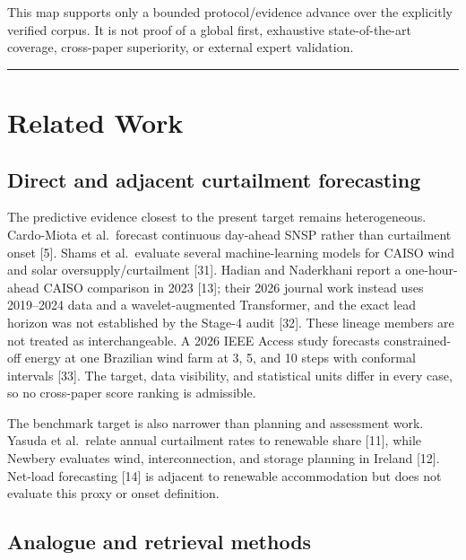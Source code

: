 \documentclass{ieeeaccess}
\begin{document}
This map supports only a bounded protocol/evidence advance over the explicitly verified corpus. It is not proof of a global first, exhaustive state-of-the-art coverage, cross-paper superiority, or external expert validation.

\begin{center}\rule{0.5\linewidth}{0.5pt}\end{center}

\section{Related Work}\label{related-work}

\subsection{Direct and adjacent curtailment forecasting}\label{direct-and-adjacent-curtailment-forecasting}

The predictive evidence closest to the present target remains heterogeneous. Cardo-Miota et al.~forecast continuous day-ahead SNSP rather than curtailment onset {[}5{]}. Shams et al.~evaluate several machine-learning models for CAISO wind and solar oversupply/curtailment {[}31{]}. Hadian and Naderkhani report a one-hour-ahead CAISO comparison in 2023 {[}13{]}; their 2026 journal work instead uses 2019--2024 data and a wavelet-augmented Transformer, and the exact lead horizon was not established by the Stage-4 audit {[}32{]}. These lineage members are not treated as interchangeable. A 2026 IEEE Access study forecasts constrained-off energy at one Brazilian wind farm at 3, 5, and 10 steps with conformal intervals {[}33{]}. The target, data visibility, and statistical units differ in every case, so no cross-paper score ranking is admissible.

The benchmark target is also narrower than planning and assessment work. Yasuda et al.~relate annual curtailment rates to renewable share {[}11{]}, while Newbery evaluates wind, interconnection, and storage planning in Ireland {[}12{]}. Net-load forecasting {[}14{]} is adjacent to renewable accommodation but does not evaluate this proxy or onset definition.

\subsection{Analogue and retrieval methods}\label{analogue-and-retrieval-methods}
\end{document}
